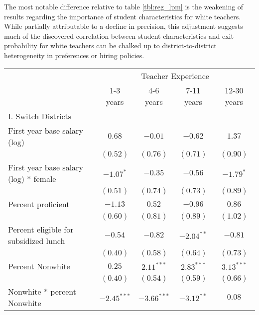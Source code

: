 \documentclass[12pt,]{article}
\begin{document}
The most notable difference relative to table \ref{tbl:reg_lpm} is the
weakening of results regarding the importance of student characteristics
for white teachers. While partially attributable to a decline in
precision, this adjustment suggests much of the discovered correlation
between student characteristics and exit probability for white teachers
can be chalked up to district-to-district heterogeneity in preferences
or hiring policies.

\begin{sidewaystable}
\begin{center}
\begin{tabular}{l c c c c }
\hline
 & \multicolumn{4}{c}{Teacher Experience} \\ \cline{2-5}
 & 1-3 years & 4-6 years & 7-11 years & 12-30 years \\
\hline
I. Switch Districts                             &               &               &               &              \\
\quad First year base salary (log)           & $0.68$        & $-0.01$       & $-0.62$       & $1.37$       \\
                                                & $(0.52)$      & $(0.76)$      & $(0.71)$      & $(0.90)$     \\
\quad First year base salary (log) * female  & $-1.07^{*}$   & $-0.35$       & $-0.56$       & $-1.79^{*}$  \\
                                                & $(0.51)$      & $(0.74)$      & $(0.73)$      & $(0.89)$     \\
\quad Percent proficient                     & $-1.13$       & $0.52$        & $-0.96$       & $0.86$       \\
                                                & $(0.60)$      & $(0.81)$      & $(0.89)$      & $(1.02)$     \\
\quad Percent eligible for subsidized lunch  & $-0.54$       & $-0.82$       & $-2.04^{**}$  & $-0.81$      \\
                                                & $(0.40)$      & $(0.58)$      & $(0.64)$      & $(0.73)$     \\
\quad Percent Nonwhite                       & $0.25$        & $2.11^{***}$  & $2.83^{***}$  & $3.13^{***}$ \\
                                                & $(0.40)$      & $(0.54)$      & $(0.59)$      & $(0.66)$     \\
\quad Nonwhite * percent Nonwhite            & $-2.45^{***}$ & $-3.66^{***}$ & $-3.12^{**}$  & $0.08$       \\

\end{tabular}
\end{center}
\end{sidewaystable}
\end{document}
